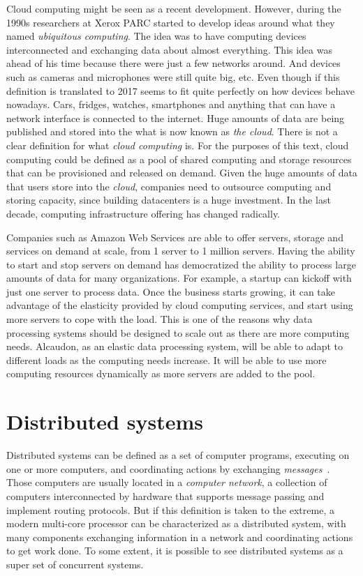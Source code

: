 Cloud computing might be seen as a recent development. However, during the 1990s
researchers at Xerox PARC started to develop ideas around what they named
\textit{ubiquitous computing}. The idea was to have computing devices
interconnected and exchanging data about almost everything. This idea was ahead
of his time because there were just a few networks around. And devices such as
cameras and microphones were still quite big, etc. Even though if this definition is
translated to 2017 seems to fit quite perfectly on how devices behave nowadays.
Cars, fridges, watches, smartphones and anything that can have a network
interface is connected to the internet. Huge amounts of data are being published
and stored into the what is now known as \textit{the cloud}. There is not a
clear definition for what \textit{cloud computing} is. For the purposes of this
text, cloud computing could be defined as a pool of shared computing and storage
resources that can be provisioned and released on demand. Given the huge amounts
of data that users store into the \textit{cloud}, companies need to outsource
computing and storing capacity, since building datacenters is a huge investment.
In the last decade, computing infrastructure offering has changed radically.

Companies such as Amazon Web Services are able to offer servers, storage and
services on demand at scale, from 1 server to 1 million servers. Having the
ability to start and stop servers on demand has democratized the ability to
process large amounts of data for many organizations. For example, a startup can
kickoff with just one server to process data. Once the business starts growing,
it can take advantage of the elasticity provided by cloud computing services,
and start using more servers to cope with the load. This is one of the reasons why
data processing systems should be designed to scale out as there are more
computing needs.
Alcaudon, as an elastic data processing system, will be able to adapt to
different loads as the computing needs increase. It will be able to use more
computing resources dynamically as more servers are added to the pool.

\section{Distributed systems}
\label{subsection:distsys}

Distributed systems can be defined as a set of computer programs,
executing on one or more computers, and coordinating actions by
exchanging \textit{messages}~\cite{GuideReliable}. Those computers are
usually located in a \textit{computer network}, a collection of
computers interconnected by hardware that supports message passing and
implement routing protocols. But if this definition is taken to the
extreme, a modern multi-core processor can be characterized as a
distributed system, with many components exchanging information in a
network and coordinating actions to get work done. To some extent, it
is possible to see distributed systems as a super set of concurrent
systems.

